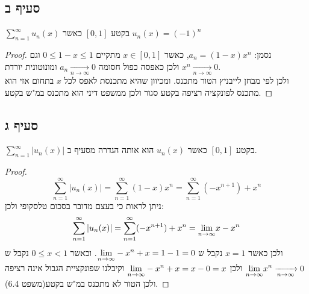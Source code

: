 \documentclass{article}
\begin{document}
	\subsection*{סעיף ב}
	$\sum_{n=1}^\infty u_n(x)$ בקטע $[0,1]$ כאשר $u_n(x) = (-1)^n$
	\begin{proof}
		נסמן: $a_n = (1-x)x^n$, כאשר $x \in [0,1]$ מתקיים $0 \leq 1-x \leq 1$ וגם $x^n \xrightarrow[n \to \infty]{} 0$ ולכן כאפסה כפול חסומה $a_n \xrightarrow[n \to \infty]{} 0$ ומונוטונית יורדת. \\
		ולכן לפי מבחן לייבניץ הטור מתכנס. ומכיוון שהיא מתכנסת לאפס לכל $x$ בתחום אזי הוא מתכנס לפונקציה רציפה בקטע סגור ולכן ממשפט דיני הוא מתכנס במ"ש בקטע.
	\end{proof}

	\subsection*{סעיף ג}
	$\sum_{n=1}^\infty |u_n(x)|$ בקטע $[0,1]$ כאשר $u_n(x)$ הוא אותה הגדרה מסעיף ב.
	\begin{proof}
		\[ \sum_{n=1}^\infty |u_n(x)|
		= \sum_{n=1}^\infty (1-x)x^n
		= \sum_{n=1}^\infty (-x^{n+1}) + x^n  \]
		ניתן לראות כי בעצם מדובר בסכום טלסקופי ולכן:
		\[
			\sum_{n=1}^\infty |u_n(x)|
			= \sum_{n=1}^\infty (-x^{n+1}) + x^n
			= \displaystyle{\lim_{n \to \infty}} x - x^n
		\]
		ולכן כאשר $x = 1$ נקבל ש $\displaystyle{\lim_{n \to \infty}} -x^n + x = 1-1 = 0$.
		וכאשר $0 \leq x < 1$ נקבל ש $\displaystyle{\lim_{n \to \infty}} x^n \xrightarrow[n \to \infty]{} 0$ ולכן $\displaystyle{\lim_{n \to \infty}} -x^n + x = x - 0 = x$
		וקיבלנו שפונקציית הגבול אינה רציפה ולכן הטור לא מתכנס במ"ש בקטע(משפט 6.4).
	\end{proof}

	\pagebreak
\end{document}
